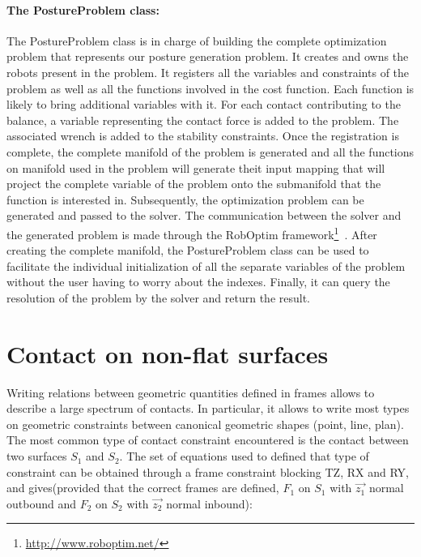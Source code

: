 \paragraph{The PostureProblem class:}
The PostureProblem class is in charge of building the complete optimization problem that represents our posture generation problem.
It creates and owns the robots present in the problem.
It registers all the variables and constraints of the problem as well as all the functions involved in the cost function.
Each function is likely to bring additional variables with it.
For each contact contributing to the balance, a variable representing the contact force is added to the problem.
The associated wrench is added to the stability constraints.
Once the registration is complete, the complete manifold of the problem is generated and all the functions on manifold used in the problem will generate theit input mapping that will project the complete variable of the problem onto the submanifold that the function is interested in.
Subsequently, the optimization problem can be generated and passed to the solver.
The communication between the solver and the generated problem is made through the RobOptim framework\footnote{\url{http://www.roboptim.net/}}~\cite{moulard:jsme:2013, moulard:jrsj:2014}.
After creating the complete manifold, the PostureProblem class can be used to facilitate the individual initialization of all the separate variables of the problem without the user having to worry about the indexes.
Finally, it can query the resolution of the problem by the solver and return the result.



\section{Contact on non-flat surfaces}
\label{sec:contact_on_non_flat_surfaces}

Writing relations between geometric quantities defined in frames allows to describe a large spectrum of contacts.
In particular, it allows to write most types on geometric constraints between canonical geometric shapes (point, line, plan).
The most common type of contact constraint encountered is the contact between two surfaces $S_1$ and $S_2$.
The set of equations used to defined that type of constraint can be obtained through a frame constraint blocking TZ, RX and RY, and gives(provided that the correct frames are defined, $F_1$ on $S_1$ with $\vec{z_1}$ normal outbound and $F_2$ on $S_2$ with $\vec{z_2}$ normal inbound):

